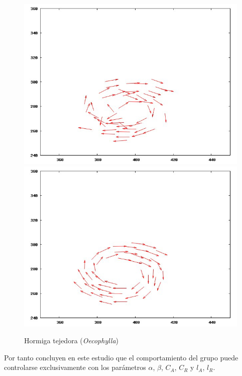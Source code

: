 \begin{figure}[!ht]
    \includegraphics[scale=0.3]{fig/cap02/atraccionRepulsion/13.png}
    \includegraphics[scale=0.3]{fig/cap02/atraccionRepulsion/14.png}
\caption{Hormiga tejedora (\textit{Oecophylla})}
\label{fig:remolino}
\end{figure}

Por tanto concluyen en este estudio que el comportamiento del grupo puede controlarse exclusivamente con los parámetros $\alpha$, $\beta$, $C_A$, $C_R$ y $l_A$, $l_R$.